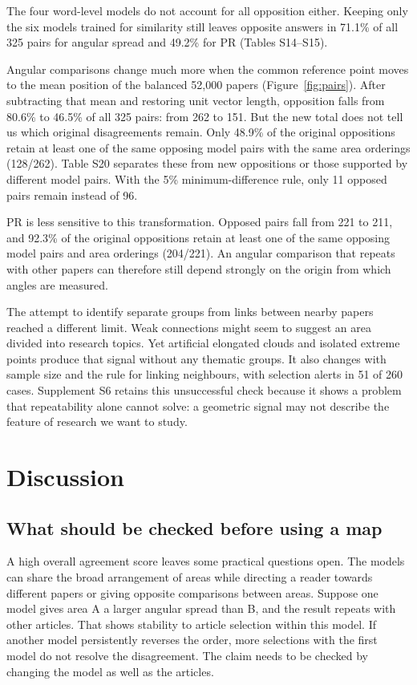 \documentclass[12pt]{article}
\begin{document}
The four word-level models do not account for all opposition either. Keeping only the six models trained for similarity still leaves opposite answers in 71.1\% of all 325 pairs for angular spread and 49.2\% for PR (Tables S14--S15).

Angular comparisons change much more when the common reference point moves to the mean position of the balanced 52,000 papers (Figure~\ref{fig:pairs}). After subtracting that mean and restoring unit vector length, opposition falls from 80.6\% to 46.5\% of all 325 pairs: from 262 to 151. But the new total does not tell us which original disagreements remain. Only 48.9\% of the original oppositions retain at least one of the same opposing model pairs with the same area orderings (128/262). Table S20 separates these from new oppositions or those supported by different model pairs. With the 5\% minimum-difference rule, only 11 opposed pairs remain instead of 96.

PR is less sensitive to this transformation. Opposed pairs fall from 221 to 211, and 92.3\% of the original oppositions retain at least one of the same opposing model pairs and area orderings (204/221). An angular comparison that repeats with other papers can therefore still depend strongly on the origin from which angles are measured.

The attempt to identify separate groups from links between nearby papers reached a different limit. Weak connections might seem to suggest an area divided into research topics. Yet artificial elongated clouds and isolated extreme points produce that signal without any thematic groups. It also changes with sample size and the rule for linking neighbours, with selection alerts in 51 of 260 cases. Supplement S6 retains this unsuccessful check because it shows a problem that repeatability alone cannot solve: a geometric signal may not describe the feature of research we want to study.

\FloatBarrier
\section{Discussion}
\subsection{What should be checked before using a map}
A high overall agreement score leaves some practical questions open. The models can share the broad arrangement of areas while directing a reader towards different papers or giving opposite comparisons between areas. Suppose one model gives area A a larger angular spread than B, and the result repeats with other articles. That shows stability to article selection within this model. If another model persistently reverses the order, more selections with the first model do not resolve the disagreement. The claim needs to be checked by changing the model as well as the articles.
\end{document}
